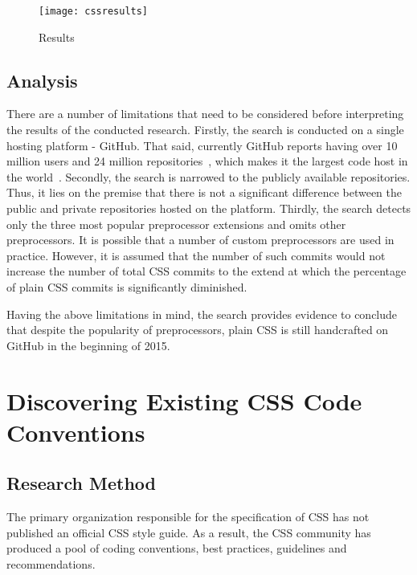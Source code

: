 \documentclass[parskip=full]{uvamscse}
\begin{document}
\begin{figure}[h!]
  \centering
  \caption{Results}
  \label{cssresults}
  \texttt{[image: cssresults]}
\end{figure}

\section{Analysis}

There are a number of limitations that need to be considered before interpreting the results of the
conducted research. Firstly, the search is conducted on a single hosting platform - GitHub. That
said, currently GitHub reports having over 10 million users and 24 million
repositories~\cite{GitHub}, which makes it the largest code host in the
world~\cite{gousios2014lean}. Secondly, the search is narrowed to the publicly available
repositories. Thus, it lies on the premise that there is not a significant difference between the
public and private repositories hosted on the platform. Thirdly, the search detects only the
three most popular preprocessor extensions and omits other preprocessors. It is possible that a
number of custom preprocessors are used in practice. However, it is assumed that the number of such
commits would not increase the number of total CSS commits to the extend at which the percentage of
plain CSS commits is significantly diminished.

Having the above limitations in mind, the search provides evidence to conclude that despite the popularity of preprocessors, plain CSS is still handcrafted on GitHub in the beginning of 2015.


\chapter{Discovering Existing CSS Code Conventions}
\label{sec:discovering}

\section{Research Method}

The primary organization responsible for the specification of CSS has not published an official CSS
style guide. As a result, the CSS community has produced a pool of coding conventions, best
practices, guidelines and recommendations.
\end{document}
